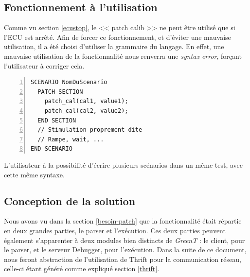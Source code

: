\subsection{Fonctionnement à l'utilisation}\label{usePatch}
Comme vu section \ref{ecustop}, le << patch calib >> ne peut être utilisé que si l'ECU est arrêté. Afin de forcer ce fonctionnement, et d'éviter une mauvaise utilisation, il a été choisi d'utiliser la grammaire du langage. En effet, une mauvaise utilisation de la fonctionnalité nous renverra une \textit{syntax error}, forçant l'utilisateur à corriger cela. 

\begin{lstlisting}[language=gtl,numbers=left,caption=Scénario de stimulation contenant des patchs de calibration]
SCENARIO NomDuScenario
  PATCH SECTION
    patch_cal(cal1, value1);
    patch_cal(cal2, value2);
  END SECTION
  // Stimulation proprement dite
  // Rampe, wait, ...
END SCENARIO
\end{lstlisting}
L'utilisateur à la possibilité d'écrire plusieurs scénarios dans un même test, avec cette même syntaxe.

\subsection{Conception de la solution}
	Nous avons vu dans la section \ref{besoin-patch} que la fonctionnalité était répartie en deux grandes parties, le parser et l'exécution. Ces deux parties peuvent également s'apparenter à deux modules bien distincts de \textit{GreenT} : le client, pour le parser, et le serveur Debugger, pour l'exécution. Dans la suite de ce document, nous feront abstraction de l'utilisation de Thrift pour la communication réseau, celle-ci étant généré comme expliqué section \ref{thrift}.
	
